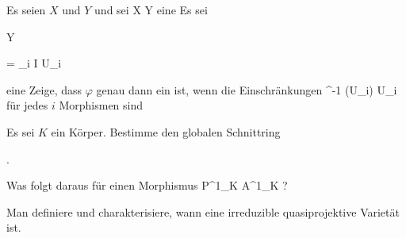 
{}

{


Es seien $X$ und $Y$
und sei
\maabb {\varphi} { X } { Y
} {}
eine
Es sei


\mavergleichskette

{\vergleichskette

{ Y
}

{ = }{ \bigcup_{i \in I} U_i
}

{  }{
}

{    }{
}

{   }{
}

}
{}{}{}
eine
Zeige, dass $\varphi$ genau dann ein
ist, wenn die Einschrän\-kungen
 { \varphi^{-1} (U_i)  } { U_i
} {}
für jedes $i$ Morphismen sind


}

{} {}



{}

{


Es sei $K$ ein Körper. Bestimme den globalen Schnittring


 { . }


Was folgt daraus für einen Morphismus
\maabb {} { {\mathbb P}^{1}_{K} } { {\mathbb A}^{1}_{K}
} {?}


}

{} {}



{}

{


Man definiere und charakterisiere, wann eine irreduzible quasiprojektive Varietät  {} ist.


}

{} {}



{}

